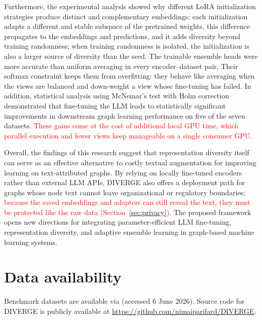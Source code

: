 \documentclass[a4paper,fleqn]{cas-sc}
\newcommand{\revone}[1]{\textcolor{red}{#1}}   %
\newcommand{\revthree}[1]{\textcolor{revgreen}{#1}} %
\DeclareRobustCommand{\revcommon}[2][]{\textcolor{revshared}{#2}} %
\begin{document}
\revcommon[R1,R2,R4]{Furthermore, the experimental analysis showed why different LoRA initialization strategies produce distinct and complementary embeddings: each initialization adapts a different and stable subspace of the pretrained weights, this difference propagates to the embeddings and predictions, and it adds diversity beyond training randomness; when training randomness is isolated, the initialization is also a larger source of diversity than the seed. The trainable ensemble heads were more accurate than uniform averaging in every encoder--dataset pair. Their softmax constraint keeps them from overfitting: they behave like averaging when the views are balanced and down-weight a view whose fine-tuning has failed.} In addition, statistical analysis using McNemar's test \revthree{with Holm correction} demonstrated that fine-tuning the LLM leads to statistically significant improvements in downstream graph learning performance \revthree{on five of the seven datasets}. \revone{These gains come at the cost of additional local GPU time, which parallel execution and fewer views keep manageable on a single consumer GPU.}

Overall, the findings of this research suggest that representation diversity itself can serve as an effective alternative to costly textual augmentation for improving learning on text-attributed graphs. By relying on locally fine-tuned encoders rather than external LLM APIs, DIVERGE also offers a deployment path for graphs whose node text cannot leave organizational or regulatory boundaries\revone{; because the saved embeddings and adapters can still reveal the text, they must be protected like the raw data (Section~\ref{sec:privacy})}. The proposed framework opens new directions for integrating parameter-efficient LLM fine-tuning, representation diversity, and adaptive ensemble learning in graph-based machine learning systems.





\section*{Data availability}
Benchmark datasets are available via \citep{Wu2025} (accessed 6 June 2026).
Source code for DIVERGE is publicly available at \url{https://github.com/nimaiparifard/DIVERGE}.
\end{document}
